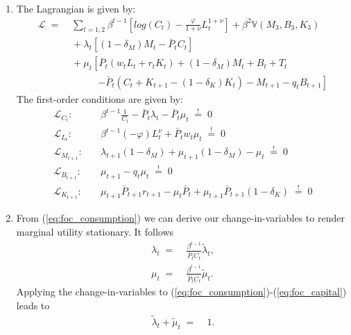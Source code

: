 \documentclass[a4paper, 12pt]{article}
\begin{document}
\begin{Answer}%
	\begin{small}%
		\begin{enumerate}%
			\item[a) ] The Lagrangian is given by:%
			\begin{align*}%
				\mathcal{L} \; = & \; \sum_{t=1,2} \beta^{t-1} \left[ log(C_t) - \frac{\varphi}{1+\nu} L_t^{1+\nu} \right] + \beta^2 \mathbb{V} \left( M_3, B_3, K_3 \right)\\%
				& \; + \lambda_t \left[ (1-\delta_M) M_t - \bar{P}_t C_t \right]\\%
				& \; + \mu_t \left[ \bar{P}_t (w_t L_t + r_t K_t) + (1-\delta_M) M_t + B_t + T_t \right.\\%
				& \quad \quad \quad  \left. - \bar{P}_t \left(C_t + K_{t+1} - (1-\delta_K) K_t\right) - M_{t+1} - q_t B_{t+1} \right]%
			\end{align*}%
			The first-order conditions are given by:%
			\begin{align}%
				\mathcal{L}_{C_t}: \quad & \beta^{t-1} \frac{1}{C_t} - \bar{P}_t \lambda_t - \bar{P}_t \mu_t \; \overset{!}{=} \; 0\label{eq:foc_consumption}\\%
				\mathcal{L}_{L_t}: \quad & \beta^{t-1} (-\varphi) L_t^\nu + \bar{P}_t w_t \mu_t \; \overset{!}{=} \; 0\label{eq:foc_labor}\\%
				\mathcal{L}_{M_{t+1}}: \quad & \lambda_{t+1} (1-\delta_M) + \mu_{t+1} (1-\delta_M) - \mu_t \; \overset{!}{=} \; 0\label{eq:foc_money}\\%
				\mathcal{L}_{B_{t+1}}: \quad & \mu_{t+1} - q_t \mu_t \; \overset{!}{=} \; 0\label{eq:foc_bond}\\%
				\mathcal{L}_{K_{t+1}}: \quad & \mu_{t+1} \bar{P}_{t+1} r_{t+1} - \mu_t \bar{P}_t + \mu_{t+1} \bar{P}_{t+1} (1-\delta_K) \; \overset{!}{=} \; 0\label{eq:foc_capital}%
			\end{align}%
			\item[b) ] From (\ref{eq:foc_consumption}) we can derive our change-in-variables to render marginal utility stationary. It follows%
			\begin{align}%
				\lambda_t \; = & \; \frac{\beta^{t-1}}{\bar{P}_t C_t} \tilde{\lambda}_t,\\%
				\mu_t \; = & \; \frac{\beta^{t-1}}{\bar{P}_t C_t} \tilde{\mu}_t.%
			\end{align}%
			Applying the change-in-variables to (\ref{eq:foc_consumption})-(\ref{eq:foc_capital}) leads to%
			\begin{align}%
				\tilde{\lambda}_t + \tilde{\mu}_t \; = & \; 1.\label{eq:foc_consumption_2}\\%

\end{align}
\end{enumerate}
\end{small}
\end{Answer}
\end{document}
